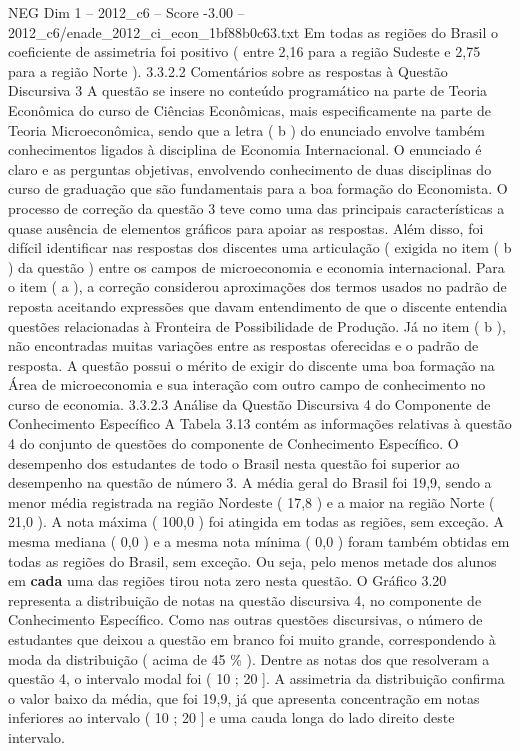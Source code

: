 \begin{textsample}{NEG Dim 1 – 2012\_c6 – Score -3.00 – 2012\_c6/enade\_2012\_ci\_econ\_1bf88b0c63.txt}
Em todas as regiões do Brasil o coeficiente de assimetria foi positivo ( entre 2,16 para a região Sudeste e 2,75 para a região Norte ). 3.3.2.2 Comentários sobre as respostas à Questão Discursiva 3 A questão se insere no conteúdo programático na parte de Teoria Econômica do curso de Ciências Econômicas, mais especificamente na parte de Teoria Microeconômica, sendo que a letra ( b ) do enunciado envolve também conhecimentos ligados à disciplina de Economia Internacional.
O enunciado é claro e as perguntas objetivas, envolvendo conhecimento de duas disciplinas do curso de graduação que são fundamentais para a boa formação do Economista.
O processo de correção da questão 3 teve como uma das principais características a quase ausência de elementos gráficos para apoiar as respostas.
Além disso, foi difícil identificar nas respostas dos discentes uma articulação ( exigida no item ( b ) da questão ) entre os campos de microeconomia e economia internacional.
Para o item ( a ), a correção considerou aproximações dos termos usados no padrão de reposta aceitando expressões que davam entendimento de que o discente entendia questões relacionadas à Fronteira de Possibilidade de Produção.
Já no item ( b ), não encontradas muitas variações entre as respostas oferecidas e o padrão de resposta.
A questão possui o mérito de exigir do discente uma boa formação na Área de microeconomia e sua interação com outro campo de conhecimento no curso de economia. 3.3.2.3 Análise da Questão Discursiva 4 do Componente de Conhecimento Específico A Tabela 3.13 contém as informações relativas à questão 4 do conjunto de questões do componente de Conhecimento Específico.
O desempenho dos estudantes de todo o Brasil nesta questão foi superior ao desempenho na questão de número 3.
A média geral do Brasil foi 19,9, sendo a menor média registrada na região Nordeste ( 17,8 ) e a maior na região Norte ( 21,0 ).
A nota máxima ( 100,0 ) foi atingida em todas as regiões, sem exceção.
A mesma mediana ( 0,0 ) e a mesma nota mínima ( 0,0 ) foram também obtidas em todas as regiões do Brasil, sem exceção.
Ou seja, pelo menos metade dos alunos em \textbf{cada} uma das regiões tirou nota zero nesta questão.
O Gráfico 3.20 representa a distribuição de notas na questão discursiva 4, no componente de Conhecimento Específico.
Como nas outras questões discursivas, o número de estudantes que deixou a questão em branco foi muito grande, correspondendo à moda da distribuição ( acima de 45 \% ).
Dentre as notas dos que resolveram a questão 4, o intervalo modal foi ( 10 ; 20 ].
A assimetria da distribuição confirma o valor baixo da média, que foi 19,9, já que apresenta concentração em notas inferiores ao intervalo ( 10 ; 20 ] e uma cauda longa do lado direito deste intervalo.

\end{textsample}
